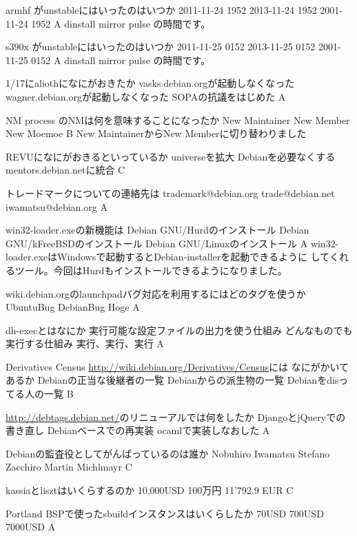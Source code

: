 %

\santaku
{armhf がunstableにはいったのはいつか}
{2011-11-24 1952}
{2013-11-24 1952}
{2001-11-24 1952}
{A}
{dinstall mirror pulse の時間です。}

\santaku
{s390x がunstableにはいったのはいつか}
{2011-11-25 0152}
{2013-11-25 0152}
{2001-11-25 0152}
{A}
{dinstall mirror pulse の時間です。}

\santaku
{1/17にaliothになにがおきたか}
{vasks.debian.orgが起動しなくなった}
{wagner.debian.orgが起動しなくなった}
{SOPAの抗議をはじめた}
{A}
{}

\santaku
{NM process のNMは何を意味することになったか}
{New Maintainer}
{New Member}
{New Moemoe}
{B}
{New MaintainerからNew Memberに切り替わりました}

\santaku
{REVUになにがおきるといっているか}
{universeを拡大}
{Debianを必要なくする}
{mentors.debian.netに統合}
{C}
{}

\santaku
{トレードマークについての連絡先は}
{trademark@debian.org}
{trade@debian.net}
{iwamatsu@debian.org}
{A}
{}

\santaku
{win32-loader.exeの新機能は}
{Debian GNU/Hurdのインストール}
{Debian GNU/kFreeBSDのインストール}
{Debian GNU/Linuxのインストール}
{A}
{win32-loader.exeはWindowsで起動するとDebian-installerを起動できるように
してくれるツール。今回はHurdもインストールできるようになりました。}

\santaku
{wiki.debian.orgのlaunchpadバグ対応を利用するにはどのタグを使うか}
{UbuntuBug}
{DebianBug}
{Hoge}
{A}
{}

\santaku
{dh-execとはなにか}
{実行可能な設定ファイルの出力を使う仕組み}
{どんなものでも実行する仕組み}
{実行、実行、実行}
{A}
{}

\santaku
{Derivatives Census \url{http://wiki.debian.org/Derivatives/Census}には
なにがかいてあるか}
{Debianの正当な後継者の一覧}
{Debianからの派生物の一覧}
{Debianをdisってる人の一覧}
{B}
{}

\santaku
{\url{http://debtags.debian.net/}のリニューアルでは何をしたか}
{DjangoとjQueryでの書き直し}
{Debianベースでの再実装}
{ocamlで実装しなおした}
{A}
{}

\santaku
{Debianの監査役としてがんばっているのは誰か}
{Nobuhiro Iwamatsu}
{Stefano Zacchiro}
{Martin Michlmayr}
{C}
{}

\santaku
{kassiaとlisztはいくらするのか}
{10,000USD}
{100万円}
{11'792.9 EUR}
{C}
{}

\santaku
{Portland BSPで使ったsbuildインスタンスはいくらしたか}
{70USD}
{700USD}
{7000USD}
{A}
{}

